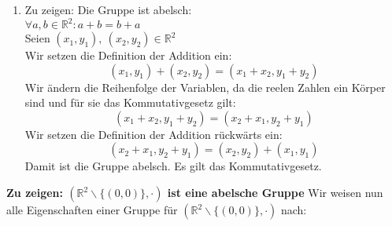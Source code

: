 \documentclass{article}
\begin{document}
\begin{enumerate}[ label = (\alph*) ]
        \item Zu zeigen: Die Gruppe ist abelsch: \\
        \( \forall a, b \in \mathbb{R}^2: a + b = b + a\) \\
        Seien \( (x_1, y_1), \ (x_2, y_2) \in \mathbb{R}^2 \) \\
        Wir setzen die Definition der Addition ein:
        \[ (x_1, y_1) + (x_2, y_2)  = (x_1 + x_2 , y_1 + y_2) \]
        Wir ändern die Reihenfolge der Variablen, da die reelen Zahlen ein Körper sind und für sie das Kommutativgesetz gilt:
        \[ (x_1 + x_2 , y_1 + y_2) = (x_2 + x_1 , y_2 + y_1) \]
        Wir setzen die Definition der Addition rückwärts ein:
        \[ (x_2 + x_1 , y_2 + y_1) = (x_2, y_2) + (x_1, y_1) \]
        Damit ist die Gruppe abelsch. Es gilt das Kommutativgesetz.

    \end{enumerate}

    \textbf{Zu zeigen: \( (\mathbb{R}^2 \backslash \{(0, 0)\}, \cdot) \) ist eine abelsche Gruppe }
    Wir weisen nun alle Eigenschaften einer Gruppe für \( (\mathbb{R}^2 \backslash \{(0, 0)\}, \cdot) \) nach:
\end{document}
